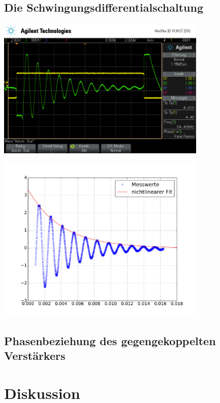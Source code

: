 \documentclass[]{scrartcl}
\begin{document}
\subsection{Die Schwingungsdifferentialschaltung}

\begin{center}
	\includegraphics[width=10cm]{images/schwinggen.png}
	\label{fig:thermoexpon}
\end{center}

\begin{center}
	\includegraphics[width=10cm]{images/schwing_abfall.pdf}
	\label{fig:expfit}
\end{center}


\subsection{Phasenbeziehung des gegengekoppelten Verstärkers}

\section{Diskussion}
\end{document}
